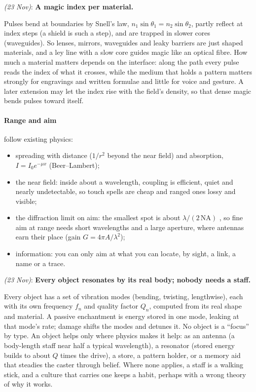 \documentclass[11pt,a4paper]{article}
\newcommand{\decision}[3]{\par\smallskip\noindent{\color{dec}\textbf{Decision #1}} \textit{(#2)}: \textbf{#3}\par}
\begin{document}
\decision{MS2}{23 Nov}{A magic index per material.}

Pulses bend at boundaries by Snell's law, $n_1 \sin\theta_1 = n_2\sin\theta_2$, partly reflect at index steps (a shield is such a step), and are trapped in slower cores (waveguides). So lenses, mirrors, waveguides and leaky barriers are just shaped materials, and a ley line with a slow core guides magic like an optical fibre. How much a material matters depends on the interface: along the path every pulse reads the index of what it crosses, while the medium that holds a pattern matters strongly for engravings and written formulae and little for voice and gesture. A later extension may let the index rise with the field's density, so that dense magic bends pulses toward itself.

\paragraph{Range and aim} follow existing physics:
\begin{itemize}
  \item spreading with distance ($1/r^2$ beyond the near field) and absorption, $I = I_0 e^{-\mu x}$ (Beer--Lambert);
  \item the near field: inside about a wavelength, coupling is efficient, quiet and nearly undetectable, so touch spells are cheap and ranged ones lossy and visible;
  \item the diffraction limit on aim: the smallest spot is about $\lambda/(2\,\mathrm{NA})$ \cite{abbe}, so fine aim at range needs short wavelengths and a large aperture, where antennas earn their place (gain $G = 4\pi A/\lambda^2$);
  \item information: you can only aim at what you can locate, by sight, a link, a name or a trace.
\end{itemize}

\decision{MS4}{23 Nov}{Every object resonates by its real body; nobody needs a staff.}

Every object has a set of vibration modes (bending, twisting, lengthwise), each with its own frequency $f_n$ and quality factor $Q_n$, computed from its real shape and material. A passive enchantment is energy stored in one mode, leaking at that mode's rate; damage shifts the modes and detunes it. No object is a ``focus'' by type. An object helps only where physics makes it help: as an antenna (a body-length staff near half a typical wavelength), a resonator (stored energy builds to about $Q$ times the drive), a store, a pattern holder, or a memory aid that steadies the caster through belief. Where none applies, a staff is a walking stick, and a culture that carries one keeps a habit, perhaps with a wrong theory of why it works.
\end{document}
